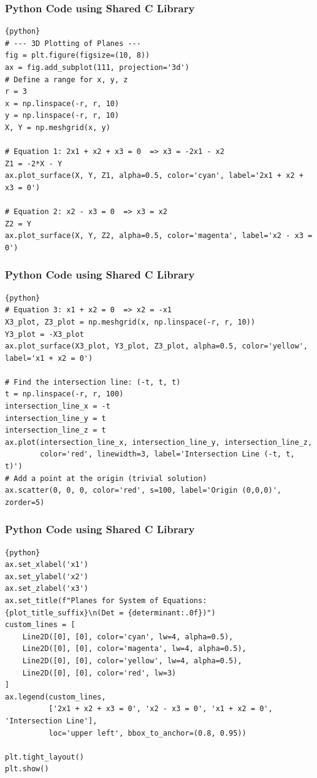 \documentclass{beamer}
\begin{document}
\begin{frame}[fragile]
\frametitle{Python Code using Shared C Library }
\begin{lstlisting}{python}
# --- 3D Plotting of Planes ---
fig = plt.figure(figsize=(10, 8))
ax = fig.add_subplot(111, projection='3d')
# Define a range for x, y, z
r = 3
x = np.linspace(-r, r, 10)
y = np.linspace(-r, r, 10)
X, Y = np.meshgrid(x, y)

# Equation 1: 2x1 + x2 + x3 = 0  => x3 = -2x1 - x2
Z1 = -2*X - Y
ax.plot_surface(X, Y, Z1, alpha=0.5, color='cyan', label='2x1 + x2 + x3 = 0')

# Equation 2: x2 - x3 = 0  => x3 = x2
Z2 = Y
ax.plot_surface(X, Y, Z2, alpha=0.5, color='magenta', label='x2 - x3 = 0')
\end{lstlisting}
\end{frame}

\begin{frame}[fragile]
\frametitle{Python Code using Shared C Library }
\begin{lstlisting}{python}
# Equation 3: x1 + x2 = 0  => x2 = -x1
X3_plot, Z3_plot = np.meshgrid(x, np.linspace(-r, r, 10))
Y3_plot = -X3_plot
ax.plot_surface(X3_plot, Y3_plot, Z3_plot, alpha=0.5, color='yellow', label='x1 + x2 = 0')

# Find the intersection line: (-t, t, t)
t = np.linspace(-r, r, 100)
intersection_line_x = -t
intersection_line_y = t
intersection_line_z = t
ax.plot(intersection_line_x, intersection_line_y, intersection_line_z,
        color='red', linewidth=3, label='Intersection Line (-t, t, t)')
# Add a point at the origin (trivial solution)
ax.scatter(0, 0, 0, color='red', s=100, label='Origin (0,0,0)', zorder=5)
\end{lstlisting}
\end{frame}

\begin{frame}[fragile]
\frametitle{Python Code using Shared C Library}
\begin{lstlisting}{python}
ax.set_xlabel('x1')
ax.set_ylabel('x2')
ax.set_zlabel('x3')
ax.set_title(f"Planes for System of Equations: {plot_title_suffix}\n(Det = {determinant:.0f})")
custom_lines = [
    Line2D([0], [0], color='cyan', lw=4, alpha=0.5),
    Line2D([0], [0], color='magenta', lw=4, alpha=0.5),
    Line2D([0], [0], color='yellow', lw=4, alpha=0.5),
    Line2D([0], [0], color='red', lw=3)
]
ax.legend(custom_lines,
          ['2x1 + x2 + x3 = 0', 'x2 - x3 = 0', 'x1 + x2 = 0', 'Intersection Line'],
          loc='upper left', bbox_to_anchor=(0.8, 0.95))

plt.tight_layout()
plt.show()
\end{lstlisting}
\end{frame}
\end{document}
